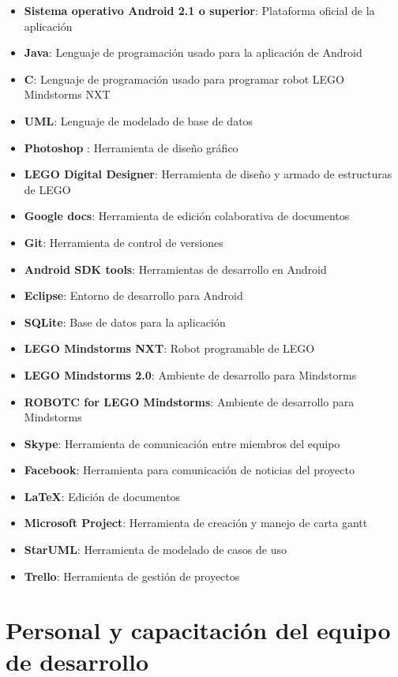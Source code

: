 \begin{itemize}
    \item {\bf Sistema operativo Android 2.1 o superior}: Plataforma oficial de la aplicaci\'on
    \item {\bf Java}: Lenguaje de programaci\'on usado para la aplicaci\'on de Android
    \item {\bf C}: Lenguaje de programaci\'on usado para programar robot LEGO Mindstorms NXT
    \item {\bf UML}: Lenguaje de modelado de base de datos
    \item {\bf Photoshop }: Herramienta de dise\~no gr\'afico
    \item {\bf LEGO Digital Designer}: Herramienta de dise\~no y armado de estructuras de LEGO
    \item {\bf Google docs}: Herramienta de edici\'on colaborativa de documentos
    \item {\bf Git}: Herramienta de control de versiones
    \item {\bf Android SDK tools}: Herramientas de desarrollo en Android
    \item {\bf Eclipse}: Entorno de desarrollo para Android
    \item {\bf SQLite}: Base de datos para la aplicaci\'on
    \item {\bf LEGO Mindstorms NXT}: Robot programable de LEGO
    \item {\bf LEGO Mindstorms 2.0}: Ambiente de desarrollo para Mindstorms
    \item {\bf ROBOTC for LEGO Mindstorms}: Ambiente de desarrollo para Mindstorms
    \item {\bf Skype}: Herramienta de comunicaci\'on entre miembros del equipo
    \item {\bf Facebook}: Herramienta para comunicaci\'on de noticias del proyecto
    \item {\bf \LaTeX}: Edici\'on de documentos
    \item {\bf Microsoft Project}: Herramienta de creaci\'on y manejo de carta gantt
    \item {\bf StarUML}: Herramienta de modelado de casos de uso
    \item {\bf Trello}: Herramienta de gesti\'on de proyectos
\end{itemize}

\newpage
\section{Personal y capacitaci\'on del equipo de desarrollo}

